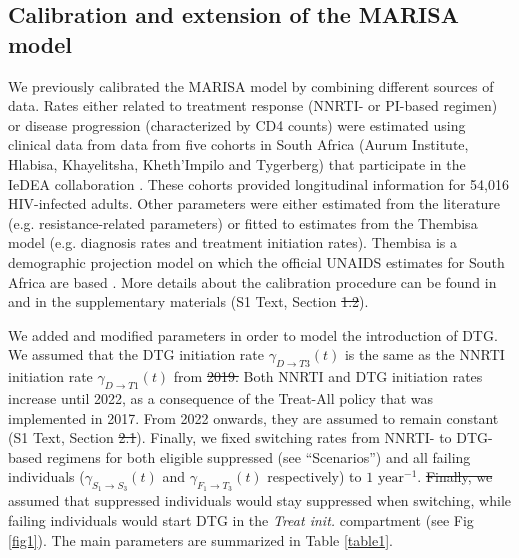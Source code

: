 \documentclass[10pt,letterpaper]{article}
\providecommand{\DIFaddtex}[1]{{\protect\color{blue}\uwave{#1}}} %
\providecommand{\DIFdeltex}[1]{{\protect\color{red}\sout{#1}}}                      %
\providecommand{\DIFaddbegin}{} %
\providecommand{\DIFaddend}{} %
\providecommand{\DIFdelbegin}{} %
\providecommand{\DIFdelend}{} %
\providecommand{\DIFadd}[1]{\texorpdfstring{\DIFaddtex{#1}}{#1}} %
\providecommand{\DIFdel}[1]{\texorpdfstring{\DIFdeltex{#1}}{}} %
\newcommand{\DIFscaledelfig}{0.5}
\newlength{\DIFdelgraphicswidth} %
\newlength{\DIFdelgraphicsheight} %
\newcommand{\DIFaddincludegraphics}[2][]{{\color{blue}\fbox{\DIFOincludegraphics[#1]{#2}}}} %
\newcommand{\DIFdelincludegraphics}[2][]{%
\sbox{\DIFdelgraphicsbox}{\DIFOincludegraphics[#1]{#2}}%
\settoboxwidth{\DIFdelgraphicswidth}{\DIFdelgraphicsbox} %
\settoboxtotalheight{\DIFdelgraphicsheight}{\DIFdelgraphicsbox} %
\scalebox{\DIFscaledelfig}{%
\parbox[b]{\DIFdelgraphicswidth}{\usebox{\DIFdelgraphicsbox}\\[-\baselineskip] \rule{\DIFdelgraphicswidth}{0em}}\llap{\resizebox{\DIFdelgraphicswidth}{\DIFdelgraphicsheight}{%
\setlength{\unitlength}{\DIFdelgraphicswidth}%
\begin{picture}(1,1)%
\thicklines\linethickness{2pt} %
{\color[rgb]{1,0,0}\put(0,0){\framebox(1,1){}}}%
{\color[rgb]{1,0,0}\put(0,0){\line( 1,1){1}}}%
{\color[rgb]{1,0,0}\put(0,1){\line(1,-1){1}}}%
\end{picture}%
}\hspace*{3pt}}} %
} %
\DeclareRobustCommand{\DIFaddbegin}{\DIFOaddbegin \let\includegraphics\DIFaddincludegraphics} %
\DeclareRobustCommand{\DIFaddend}{\DIFOaddend \let\includegraphics\DIFOincludegraphics} %
\DeclareRobustCommand{\DIFdelbegin}{\DIFOdelbegin \let\includegraphics\DIFdelincludegraphics} %
\DeclareRobustCommand{\DIFdelend}{\DIFOaddend \let\includegraphics\DIFOincludegraphics} %
\begin{document}
\subsection*{Calibration and extension of the MARISA model}
We previously calibrated the MARISA model by combining different sources of data. Rates either related to treatment response (NNRTI- or PI-based regimen) or disease progression (characterized by CD4 counts) were estimated using clinical data from data from five cohorts in South Africa (Aurum Institute, Hlabisa, Khayelitsha, Kheth’Impilo and Tygerberg) that participate in the IeDEA collaboration  \cite{Egger2012}. These cohorts provided longitudinal information for 54,016 HIV-infected adults. Other parameters were either estimated from the literature (e.g. resistance-related parameters) or fitted to estimates from the Thembisa model (e.g. diagnosis rates and treatment initiation rates). Thembisa is a demographic projection model on which the official UNAIDS estimates for South Africa are based \cite{Johnson2017b}. More details about the calibration procedure can be found in \cite{Hauser2019} and in the supplementary materials (S1 Text, Section \DIFdelbegin \DIFdel{1.2}\DIFdelend \DIFaddbegin \DIFadd{1.1}\DIFaddend ).

We added and modified parameters in order to model the introduction of DTG. We assumed that the DTG initiation rate $\gamma_{D\rightarrow T3}^{}(t)$ is the same as the NNRTI initiation rate $\gamma_{D\rightarrow T1}^{}(t)$ from \DIFdelbegin \DIFdel{2019. }\DIFdelend \DIFaddbegin \DIFadd{2020. }\DIFaddend Both NNRTI and DTG initiation rates increase until 2022, as a consequence of the Treat-All policy that was implemented in 2017. From 2022 onwards, they are assumed to remain constant (S1 Text, Section \DIFdelbegin \DIFdel{2.1}\DIFdelend \DIFaddbegin \DIFadd{2.2}\DIFaddend ). Finally, we fixed switching rates from NNRTI- to DTG-based regimens for both eligible suppressed (see “Scenarios”) and all failing individuals ($\gamma_{S_1\rightarrow S_3}^{}(t)$ and $\gamma_{F_1\rightarrow T_3}^{}(t)$ respectively) to $1\text{ year}^{-1}$. \DIFdelbegin \DIFdel{Finally, we }\DIFdelend \DIFaddbegin \DIFadd{We }\DIFaddend assumed that suppressed individuals would stay suppressed when switching, while failing individuals would start DTG in the \textit{Treat init.} compartment (see Fig \ref{fig1}). The main parameters are summarized in Table \ref{table1}.

\newcolumntype{b}{X}
\newcommand{\heading}[1]{\multicolumn{1}{c}{#1}}
\newcommand\Tstrut{\rule{0pt}{2.8ex}}         %
\newcommand\Bstrut{\rule[-1ex]{0pt}{0pt}}
\end{document}
